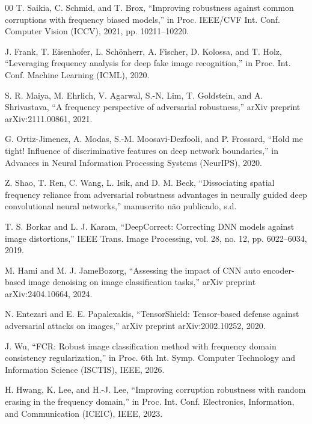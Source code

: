 \documentclass[conference]{IEEEtran}
\begin{document}
\begin{thebibliography}{00}
 T. Saikia, C. Schmid, and T. Brox, ``Improving robustness against
common corruptions with frequency biased models,'' in Proc. IEEE/CVF Int. Conf.
Computer Vision (ICCV), 2021, pp. 10211--10220.

 J. Frank, T. Eisenhofer, L. Sch\"onherr, A. Fischer, D. Kolossa,
and T. Holz, ``Leveraging frequency analysis for deep fake image recognition,''
in Proc. Int. Conf. Machine Learning (ICML), 2020.

 S. R. Maiya, M. Ehrlich, V. Agarwal, S.-N. Lim, T. Goldstein, and
A. Shrivastava, ``A frequency perspective of adversarial robustness,'' arXiv
preprint arXiv:2111.00861, 2021.

 G. Ortiz-Jimenez, A. Modas, S.-M. Moosavi-Dezfooli, and P.
Frossard, ``Hold me tight! Influence of discriminative features on deep network
boundaries,'' in Advances in Neural Information Processing Systems (NeurIPS),
2020.

 Z. Shao, T. Ren, C. Wang, L. Isik, and D. M. Beck,
``Dissociating spatial frequency reliance from adversarial robustness
advantages in neurally guided deep convolutional neural networks,'' manuscrito
não publicado, s.d.

 T. S. Borkar and L. J. Karam, ``DeepCorrect: Correcting DNN
models against image distortions,'' IEEE Trans. Image Processing, vol. 28, no.
12, pp. 6022--6034, 2019.

 M. Hami and M. J. JameBozorg, ``Assessing the impact of CNN auto
encoder-based image denoising on image classification tasks,'' arXiv preprint
arXiv:2404.10664, 2024.

 N. Entezari and E. E. Papalexakis, ``TensorShield: Tensor-based
defense against adversarial attacks on images,'' arXiv preprint
arXiv:2002.10252, 2020.

 J. Wu, ``FCR: Robust image classification method with frequency
domain consistency regularization,'' in Proc. 6th Int. Symp. Computer
Technology and Information Science (ISCTIS), IEEE, 2026.

 H. Hwang, K. Lee, and H.-J. Lee, ``Improving corruption
robustness with random erasing in the frequency domain,'' in Proc. Int. Conf.
Electronics, Information, and Communication (ICEIC), IEEE, 2023.

\end{thebibliography}
\end{document}
